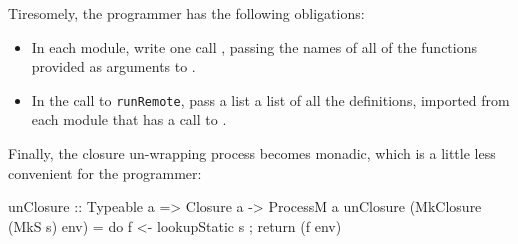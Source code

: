 \documentclass[preprint]{sigplanconf}
\begin{document}
Tiresomely, the programmer has the following obligations:
\begin{itemize}
\item In each module, write one call ,
passing the names of all of the functions provided as arguments to .
\item In the call to \texttt{runRemote}, pass a list
a list of all the  definitions, imported from
each module that has a call to .
\end{itemize}

Finally, the closure un-wrapping process becomes monadic, which is
a little less convenient for the programmer:
\begin{code}
  unClosure :: Typeable a => Closure a -> ProcessM a
  unClosure (MkClosure (MkS s) env)
        = do { f <- lookupStatic s
             ; return (f env) }
\end{code}
\end{document}
